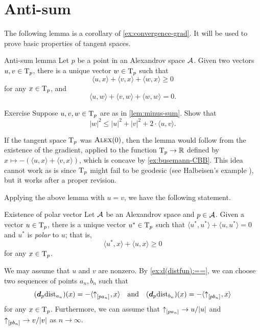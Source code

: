\section{Anti-sum}

The following lemma is a corollary of \ref{ex:convergence-grad}.
It will be used to prove basic properties of tangent spaces.

\begin{thm}{Anti-sum lemma}\label{lem:minus-sum} 
Let $p$ be a point in an Alexandrov space $\mathcal{A}$.
Given two vectors $u,v\in \mathrm{T}_p$, there is a unique vector $w\in \mathrm{T}_p$ such that
\[\langle u,x\rangle+\langle v,x\rangle+\langle w,x\rangle\ge0\]
for any $x\in \mathrm{T}_p$, and
\[\langle u,w\rangle+\langle v,w\rangle+\langle w,w\rangle=0.\]

\end{thm}

\begin{thm}[!]{Exercise}\label{ex:|antisum|}
Suppose $u,v, w\in \mathrm{T}_p$ are as in \ref{lem:minus-sum}.
Show that 
\[|w|^2\le |u|^2+|v|^2+2\cdot\langle u,v\rangle.\]

\end{thm}

If the tangent space $\mathrm{T}_p$ was $\textup{\textsc{Alex}}(0)$, then the lemma would follow from the existence of the gradient, applied to the function $\mathrm{T}_p\to \mathbb{R}$ defined by $x\mapsto -(\langle u,x\rangle +\langle v,x\rangle )$, which is concave by \ref{ex:busemann-CBB}.
This idea cannot work as is since $\mathrm{T}_p$ might fail to be geodesic (see Halbeisen's example \cite[13.6]{alexander-kapovitch-petrunin2024}), but it works after a proper revision.

Applying the above lemma with $u=v$, we have the following statement.

\begin{thm}{Existence of polar vector}\label{cor:polar}
Let $\mathcal{A}$ be an Alexandrov space 
and $p\in \mathcal{A}$. 
Given a vector $u\in \mathrm{T}_p$, there is a unique vector $u^*\in\mathrm{T}_p$ such that $\langle u^*,u^*\rangle +\langle u,u^*\rangle = 0$ and
$u^*$ is \emph{polar} to $u$;
that is,
\[\langle u^*,x\rangle +\langle u,x\rangle \ge 0\]
for any $x\in \mathrm{T}_p$.
\end{thm}

 We may assume that $u$ and $v$ are nonzero.
By \ref{ex:d(distfun):==}, we can choose two sequences of points $a_n,b_n$ such that 
\[
(\bm{d}_p\mathrm{dist}_{a_n})(x)=-\langle{\uparrow}_{[{p}{a_n}]_{{}}},x\rangle
\quad\text{and}\quad
(\bm{d}_p\mathrm{dist}_{b_n})(x)=-\langle{\uparrow}_{[{p}{b_n}]_{{}}},x\rangle
\]
for any $x\in\mathrm{T}_p$.
Furthermore, we can assume that ${\uparrow}_{[{p}{a_n}]_{{}}}\to u/|u|$ and ${\uparrow}_{[{p}{b_n}]_{{}}}\to v/|v|$ as $n\to \infty$.

